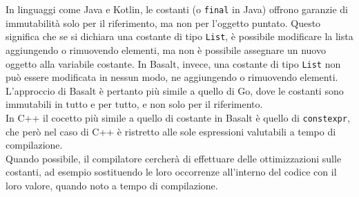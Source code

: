 In linguaggi come Java e Kotlin, le costanti (o \texttt{final} in Java) offrono garanzie di immutabilità solo per il riferimento, 
ma non per l'oggetto puntato. Questo significa che se si dichiara una costante di tipo \texttt{List}, è possibile modificare la lista
aggiungendo o rimuovendo elementi, ma non è possibile assegnare un nuovo oggetto alla variabile costante. In Basalt, invece, una costante
di tipo \texttt{List} non può essere modificata in nessun modo, ne aggiungendo o rimuovendo elementi. \\

L'approccio di Basalt è pertanto più simile a quello di Go, dove le costanti sono immutabili in tutto e per tutto, e non solo per il riferimento. \\

In C++ il cocetto più simile a quello di costante in Basalt è quello di \texttt{constexpr}, che però nel caso di C++ è ristretto alle sole espressioni
valutabili a tempo di compilazione. \\

Quando possibile, il compilatore cercherà di effettuare delle ottimizzazioni sulle costanti, ad esempio sostituendo le loro occorrenze
all'interno del codice con il loro valore, quando noto a tempo di compilazione.